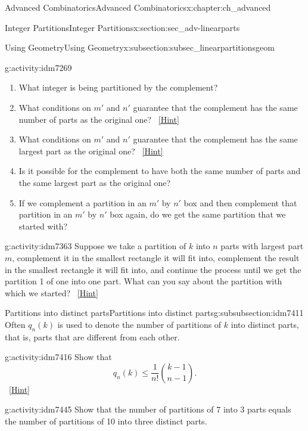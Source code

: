 \documentclass[oneside,10pt,]{book}
\numberwithin{equation}{chapter}
\begin{document}
\begin{chapterptx}{Advanced Combinatorics}{}{Advanced Combinatorics}{}{}{x:chapter:ch_advanced}
\begin{sectionptx}{Integer Partitions}{}{Integer Partitions}{}{}{x:section:sec_adv-linearparts}
\begin{subsectionptx}{Using Geometry}{}{Using Geometry}{}{}{x:subsection:subsec_linearpartitionsgeom}
\begin{introduction}{}
\begin{activity}{}{g:activity:idm7269}
\begin{enumerate}[font=\bfseries,label=(\alph*),ref=\alph*]
\item{}What integer is being partitioned by the complement?%
\item{}What conditions on \(m'\) and \(n'\) guarantee that the complement has the same number of parts as the original one?%
\qquad~\hfill{\tiny\hyperlink{g:hint:idm7306-back}{[Hint]}}\item{}What conditions on \(m'\) and \(n'\) guarantee that the complement has the same largest part as the original one?%
\qquad~\hfill{\tiny\hyperlink{g:hint:idm7323-back}{[Hint]}}\item{}Is it possible for the complement to have both the same number of parts and the same largest part as the original one?%
\item{}If we complement a partition in an \(m'\) by \(n'\) box and then complement that partition in an \(m'\) by \(n'\) box again, do we get the same partition that we started with?%
\end{enumerate}
\end{activity}
\begin{activity}{}{g:activity:idm7363}%
Suppose we take a partition of \(k\) into \(n\) parts with largest part \(m\), complement it in the smallest rectangle it will fit into, complement the result in the smallest rectangle it will fit into, and continue the process until we get the partition 1 of one into one part.  What can you say about the partition with which we started?%
\qquad~\hfill{\tiny\hyperlink{g:hint:idm7369-back}{[Hint]}}\end{activity}
\end{introduction}%
%
%
\typeout{************************************************}
\typeout{************************************************}
%
\begin{subsubsectionptx}{Partitions into distinct parts}{}{Partitions into distinct parts}{}{}{g:subsubsection:idm7411}
Often \(q_n(k)\) is used to denote the number of partitions of \(k\) into distinct parts, that is, parts that are different from each other.%
\begin{activity}{}{g:activity:idm7416}%
Show that%
\begin{equation*}
q_n(k) \le \frac{1}{n!}\binom{k-1}{n-1}.
\end{equation*}
%
\qquad~\hfill{\tiny\hyperlink{g:hint:idm7420-back}{[Hint]}}\end{activity}
\begin{activity}{}{g:activity:idm7445}%
Show that the number of partitions of 7 into 3 parts equals the number of partitions of 10 into three distinct parts.%

\end{activity}
\end{subsubsectionptx}
\end{subsectionptx}
\end{sectionptx}
\end{chapterptx}
\end{document}
